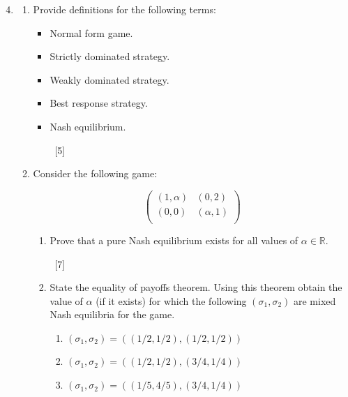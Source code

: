 \documentclass[12pt,a4paper]{article}
\renewcommand{\labelenumi}{\arabic{enumi}} %
\begin{document}
\begin{enumerate}
\setcounter{enumi}{3}

\renewcommand\labelenumi{\bfseries\theenumi.}

\item

    \begin{enumerate}
        \item Provide definitions for the following terms:
            \begin{itemize}
                \item Normal form game.

                \item Strictly dominated strategy.

                \item Weakly dominated strategy.

                \item Best response strategy.

                \item Nash equilibrium.

                    ~\hfill{[5]}
            \end{itemize}

        \item     Consider the following game:

            \[\begin{pmatrix}
            (1,\alpha) & (0,2)\\
            (0,0) & (\alpha,1)\\
            \end{pmatrix}\]

            \begin{enumerate}
            \item Prove that a pure Nash equilibrium exists for all values of
                \(\alpha\in \mathbb{R}\).

            ~\hfill{[7]}

            \item State the equality of payoffs theorem. Using this theorem
                obtain the value of \(\alpha\) (if it exists) for which the
                following \((\sigma_1, \sigma_2)\) are mixed Nash equilibria for the game.

                \begin{enumerate}
                    \item \((\sigma_1, \sigma_2) = ((1/2,1/2), (1/2,1/2))\)
                    \item \((\sigma_1, \sigma_2) = ((1/2,1/2), (3/4,1/4))\)
                    \item \((\sigma_1, \sigma_2) = ((1/5,4/5), (3/4,1/4))\)
                \end{enumerate}


\end{enumerate}
\end{enumerate}
\end{enumerate}
\end{document}
